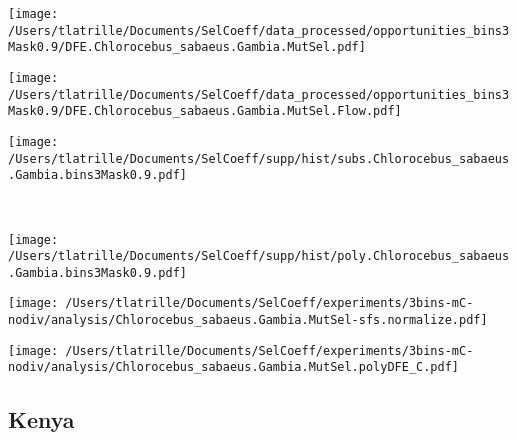 \documentclass{article}
\begin{document}
    \begin{minipage}{0.32\linewidth}
        \texttt{[image: /Users/tlatrille/Documents/SelCoeff/data\_processed/opportunities\_bins3Mask0.9/DFE.Chlorocebus\_sabaeus.Gambia.MutSel.pdf]}
    \end{minipage}
    \begin{minipage}{0.32\linewidth}
        \texttt{[image: /Users/tlatrille/Documents/SelCoeff/data\_processed/opportunities\_bins3Mask0.9/DFE.Chlorocebus\_sabaeus.Gambia.MutSel.Flow.pdf]}
    \end{minipage}
    \begin{minipage}{0.32\linewidth}
        \texttt{[image: /Users/tlatrille/Documents/SelCoeff/supp/hist/subs.Chlorocebus\_sabaeus.Gambia.bins3Mask0.9.pdf]}
    \end{minipage}
    \\
    \begin{minipage}{0.32\linewidth}
        \texttt{[image: /Users/tlatrille/Documents/SelCoeff/supp/hist/poly.Chlorocebus\_sabaeus.Gambia.bins3Mask0.9.pdf]}
    \end{minipage}
    \begin{minipage}{0.32\linewidth}
        \texttt{[image: /Users/tlatrille/Documents/SelCoeff/experiments/3bins-mC-nodiv/analysis/Chlorocebus\_sabaeus.Gambia.MutSel-sfs.normalize.pdf]}
    \end{minipage}
    \begin{minipage}{0.32\linewidth}
        \texttt{[image: /Users/tlatrille/Documents/SelCoeff/experiments/3bins-mC-nodiv/analysis/Chlorocebus\_sabaeus.Gambia.MutSel.polyDFE\_C.pdf]}
    \end{minipage}
    \subsection{Kenya}
\end{document}
